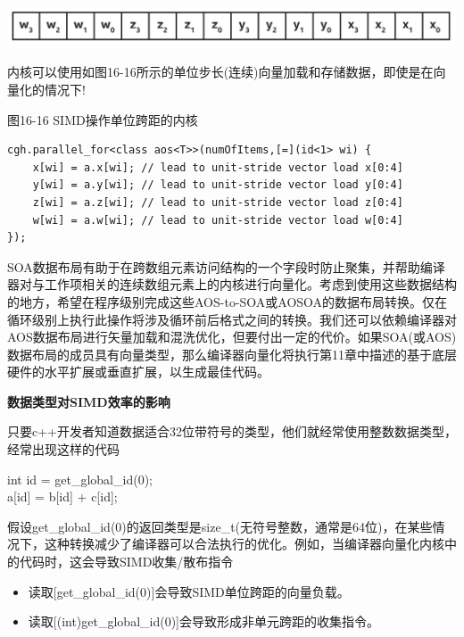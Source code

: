 \begin{center}
	\includegraphics[width=1.0\textwidth]{content/chapter-16/images/9}
\end{center}

内核可以使用如图16-16所示的单位步长(连续)向量加载和存储数据，即使是在向量化的情况下!

\hspace*{\fill} \par %
图16-16 SIMD操作单位跨距的内核
\begin{lstlisting}[caption={}]
cgh.parallel_for<class aos<T>>(numOfItems,[=](id<1> wi) {
	x[wi] = a.x[wi]; // lead to unit-stride vector load x[0:4]
	y[wi] = a.y[wi]; // lead to unit-stride vector load y[0:4]
	z[wi] = a.z[wi]; // lead to unit-stride vector load z[0:4]
	w[wi] = a.w[wi]; // lead to unit-stride vector load w[0:4]
});
\end{lstlisting}

SOA数据布局有助于在跨数组元素访问结构的一个字段时防止聚集，并帮助编译器对与工作项相关的连续数组元素上的内核进行向量化。考虑到使用这些数据结构的地方，希望在程序级别完成这些AOS-to-SOA或AOSOA的数据布局转换。仅在循环级别上执行此操作将涉及循环前后格式之间的转换。我们还可以依赖编译器对AOS数据布局进行矢量加载和混洗优化，但要付出一定的代价。如果SOA(或AOS)数据布局的成员具有向量类型，那么编译器向量化将执行第11章中描述的基于底层硬件的水平扩展或垂直扩展，以生成最佳代码。\par

\hspace*{\fill} \par %
\textbf{数据类型对SIMD效率的影响}

只要c++开发者知道数据适合32位带符号的类型，他们就经常使用整数数据类型，经常出现这样的代码\par

\begin{tcolorbox}[colback=white,colframe=black]
int id = get\_global\_id(0); \\a[id] = b[id] + c[id];
\end{tcolorbox}

假设get\_global\_id(0)的返回类型是size\_t(无符号整数，通常是64位)，在某些情况下，这种转换减少了编译器可以合法执行的优化。例如，当编译器向量化内核中的代码时，这会导致SIMD收集/散布指令

\begin{itemize}
	\item 读取[get\_global\_id(0)]会导致SIMD单位跨距的向量负载。
	\item 读取[(int)get\_global\_id(0)]会导致形成非单元跨距的收集指令。
\end{itemize}

